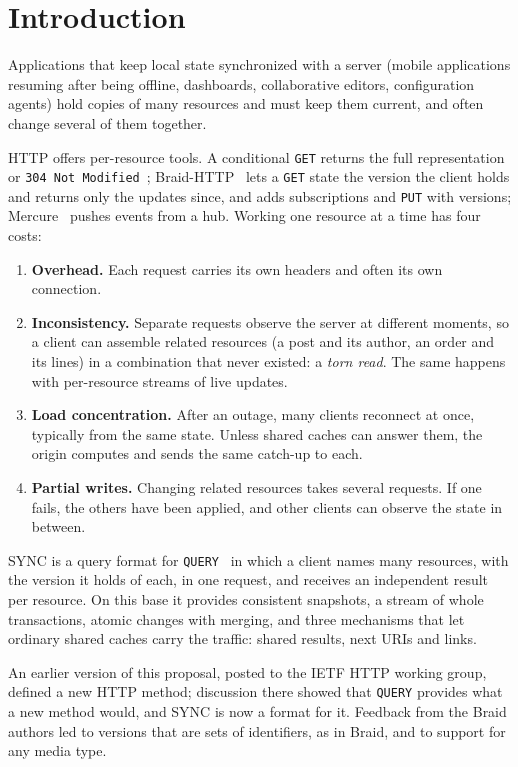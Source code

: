 \documentclass[11pt,a4paper]{article}
\begin{document}
\section{Introduction}

Applications that keep local state synchronized with a server (mobile applications resuming after being offline, dashboards, collaborative editors, configuration agents) hold copies of many resources and must keep them current, and often change several of them together.

HTTP offers per-resource tools. A conditional \texttt{GET} returns the full representation or \texttt{304 Not Modified}~\cite{rfc9110}; Braid-HTTP~\cite{braid} lets a \texttt{GET} state the version the client holds and returns only the updates since, and adds subscriptions and \texttt{PUT} with versions; Mercure~\cite{mercure} pushes events from a hub. Working one resource at a time has four costs:

\begin{enumerate}
  \item \textbf{Overhead.} Each request carries its own headers and often its own connection.
  \item \textbf{Inconsistency.} Separate requests observe the server at different moments, so a client can assemble related resources (a post and its author, an order and its lines) in a combination that never existed: a \emph{torn read}. The same happens with per-resource streams of live updates.
  \item \textbf{Load concentration.} After an outage, many clients reconnect at once, typically from the same state. Unless shared caches can answer them, the origin computes and sends the same catch-up to each.
  \item \textbf{Partial writes.} Changing related resources takes several requests. If one fails, the others have been applied, and other clients can observe the state in between.
\end{enumerate}

SYNC is a query format for \texttt{QUERY}~\cite{rfc10008} in which a client names many resources, with the version it holds of each, in one request, and receives an independent result per resource. On this base it provides consistent snapshots, a stream of whole transactions, atomic changes with merging, and three mechanisms that let ordinary shared caches carry the traffic: shared results, next URIs and links.

An earlier version of this proposal, posted to the IETF HTTP working group, defined a new HTTP method; discussion there showed that \texttt{QUERY} provides what a new method would, and SYNC is now a format for it. Feedback from the Braid authors led to versions that are sets of identifiers, as in Braid, and to support for any media type.
\end{document}
